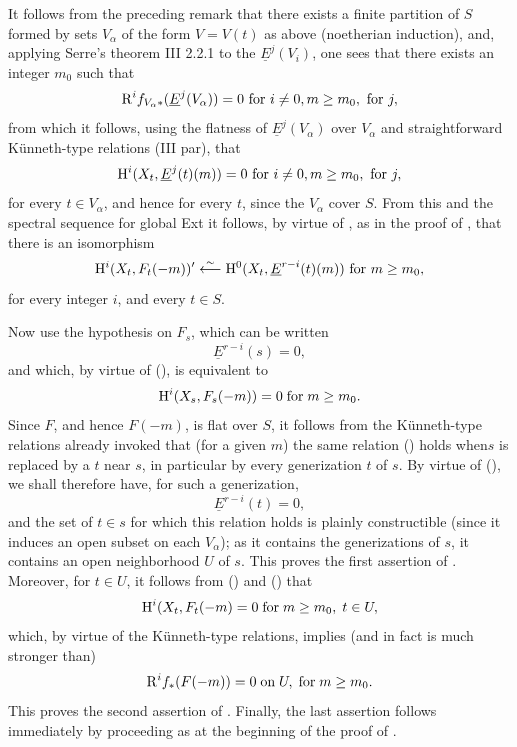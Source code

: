 It follows from the preceding remark that there exists a finite partition of $S$ formed by sets $V_\alpha$ of the form $V=V(t)$ as above (noetherian induction), and, applying Serre's theorem \EGA III 2.2.1 to the $\underline{E}^j(V_i)$, one sees that there exists an integer $m_0$ such that
\[
\mathrm R^if_{V_\alpha\ast}(\underline{E}^j(V_\alpha))=0\textup{ for } i\neq 0, m\geq m_0, \textup{ for }j,
\]
from which it follows, using the flatness of $\underline{E}^j(V_\alpha)$ over $V_\alpha$ and straightforward K\"unneth-type relations (\cf \EGA III par), that
\[
\mathrm H^i(X_t, \underline{E}^j(t)(m))=0\textup{ for } i\neq 0, m\geq m_0, \textup{ for }j,
\]
for every $t\in V_\alpha$, and hence for every $t$, since the $ V_\alpha$ cover $S$. From this and the spectral sequence for global Ext it follows, by virtue of , as in the proof of , that there is an isomorphism
\steco
\begin{equation} \label{eq:XII.8} {}\mathrm H^i(X_t, F_t(-m))' \overset{\sim}{\longleftarrow} \mathrm H^0(X_t, \underline{E}^{r-i}(t)(m))\textup{ for } m\geq m_0,
\end{equation}
for every integer $i$, and every $t\in S$.

Now use the hypothesis on $F_s$, which can be written
\steco
\begin{equation} \label{eq:XII.9} {}\underline{E}^{r-i}(s)=0,
\end{equation}
and which, by virtue of (), is equivalent to
\steco
\begin{equation} \label{eq:XII.10} {}\mathrm H^i(X_s, F_s(-m))=0 \; \text{for}\; m\geq m_0.
\end{equation}
Since $F$, and hence $F(-m)$, is flat over $S$, it follows from
the K\"unneth-type relations already invoked that (for a given $m$) the
same relation () holds when\pageoriginale $s$ is replaced by a
$t$ near $s$, in particular by every generization $t$ of
$s$. By virtue of (), we shall therefore have, for such a
generization, \steco
\begin{equation} \label{eq:XII.11} {}\underline{E}^{r-i}(t)=0,
\end{equation}
and the set of $t\in s$ for which this relation holds is plainly constructible (since it induces an open subset on each $V_\alpha$); as it contains the generizations of $s$, it contains an open neighborhood $U$ of $s$. This proves the first assertion of . Moreover, for $t\in U$, it follows from () and () that
\steco
\begin{equation} \label{eq:XII.12} {}\mathrm H^i(X_t, F_t(-m)=0 \; \text{for}\; m\geq m_0, \; t\in U,
\end{equation}
which, by virtue of the K\"unneth-type relations, implies (and in fact is much stronger than)
\steco
\begin{equation} \label{eq:XII.13} {}\mathrm R^if_\ast(F(-m))=0 \; \text{on}\; U, \; \text{for} \; m\geq m_0.
\end{equation}
This proves the second assertion of . Finally, the last assertion follows immediately by proceeding as at the beginning of the proof of .

